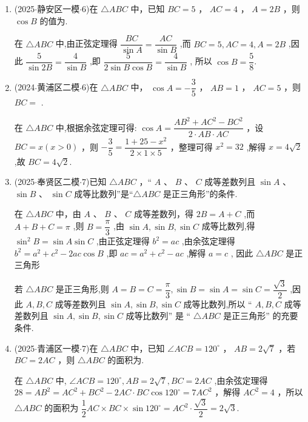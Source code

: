 \begin{enumerate}
    \item (2025$\cdot$静安区一模$\cdot$6)在 $\bigtriangleup {ABC}$ 中，已知 ${BC} = 5$ ， ${AC} = 4$ ， $A = {2B}$ ，则 $\cos B$ 的值为.
    \begin{jieda}
        在 $\bigtriangleup {ABC}$ 中,由正弦定理得 $\dfrac{BC}{\sin A} = \dfrac{AC}{\sin B}$ ,而 ${BC} =  5,{AC} = 4,A = {2B}$ ,因此 $\dfrac{5}{\sin {2B}} = \dfrac{4}{\sin B}$ ,即 $\dfrac{5}{2\sin B\cos B} = \dfrac{4}{\sin B}$ , 所以 $\cos B = \dfrac{5}{8}$.
    \end{jieda}

    \item (2024$\cdot$黄浦区二模$\cdot$6)在 $\bigtriangleup  {ABC}$ 中， $\cos A =  - \dfrac{3}{5}$ ， ${AB} = 1$ ， ${AC} = 5$ ，则 ${BC} =$ .
    \begin{jieda}
        在 $\bigtriangleup {ABC}$ 中,根据余弦定理可得: $\cos A =  \dfrac{A{B}^{2} + A{C}^{2} - B{C}^{2}}{2 \cdot  {AB} \cdot  {AC}}$ ，设 ${BC} = x\left( {x > 0}\right)$ ，则 $- \dfrac{3}{5} = \dfrac{1 + {25} - {x}^{2}}{2 \times  1 \times  5}$ ，整理可得 ${x}^{2} = {32}$ ,解得 $x = 4\sqrt{2}$ ,故 ${BC} = 4\sqrt{2}$.
    \end{jieda}

    \item (2025$\cdot$奉贤区二模$\cdot$7)已知 $\bigtriangleup  {ABC}$ ，“ $A$ 、 $B$ 、 $C$ 成等差数列且 $\sin A$ 、 $\sin B$ 、 $\sin C$ 成等比数列”是“$\bigtriangleup  {ABC}$ 是正三角形”的条件.
    \begin{jieda}
        在 $\bigtriangleup  {ABC}$ 中，由 $A$ 、 $B$ 、 $C$ 成等差数列，得 ${2B} = A +  C$ ,而 $A + B + C = \pi$ ,则 $B = \dfrac{\pi }{3}$ ,由 $\sin A,\sin B,\sin C$ 成等比数列,得 ${\sin }^{2}B = \sin A\sin C$ ,由正弦定理得 ${b}^{2} = {ac}$ ,由余弦定理得 ${b}^{2} = {a}^{2} + {c}^{2} - {2ac}\cos B$ ,即 ${ac} = {a}^{2} + {c}^{2} - {ac}$ ,解得 $a = c$ , 因此 $\bigtriangleup {ABC}$ 是正三角形
        
        若 $\bigtriangleup {ABC}$ 是正三角形,则 $A = B =  C = \dfrac{\pi }{3},\sin B = \sin A = \sin C = \dfrac{\sqrt{3}}{2}$ ,因此 $A,B,C$ 成等差数列且 $\sin A,\sin B,\sin C$ 成等比数列,所以 “ $A,B,C$ 成等差数列且 $\sin A,\sin B,\sin C$ 成等比数列” 是 “ $\bigtriangleup  {ABC}$ 是正三角形” 的充要条件.
    \end{jieda}

    \item (2025$\cdot$青浦区一模$\cdot$7)在 $\bigtriangleup  {ABC}$ 中，已知 $\angle {ACB} = {120}^{ \circ  }$ ， ${AB} = {2\sqrt{7}}$ ，若 ${BC} = {2AC}$ ，则 $\bigtriangleup  {ABC}$ 的面积为.
    \begin{jieda}
        在 $\bigtriangleup {ABC}$ 中, $\angle {ACB} = {120}^{ \circ  },{AB} = 2\sqrt{7},{BC} =  {2AC}$ ,由余弦定理得 ${28} = A{B}^{2} = A{C}^{2} + B{C}^{2} - {2AC} \cdot {BC}\cos {120}^{ \circ  } = {7A}{C}^{2}$ ，解得 $A{C}^{2} = 4$ ，所以 $\bigtriangleup  {ABC}$ 的面积为 $\dfrac{1}{2}{AC} \times  {BC} \times  \sin {120}^{ \circ  } = A{C}^{2} \cdot  \dfrac{\sqrt{3}}{2} = 2\sqrt{3}$.
    \end{jieda}


\end{enumerate}
